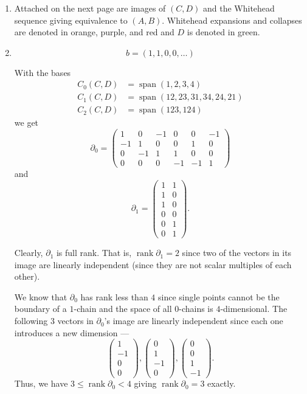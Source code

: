 \documentclass[12 pt, letterpaper]{hmcpset}
\begin{document}
\begin{solution}
	
\begin{enumerate}
	\item Attached on the next page are images of $(C, D)$ and the Whitehead sequence giving equivalence to $(A, B)$. Whitehead expansions and collapses are denoted in orange, purple, and red and $D$ is denoted in green.

	\item
		\[
			\boxed{
				b = (1, 1, 0, 0, \dots)
			}
		\]

		With the bases
		\begin{align*}
			C_{0}(C, D) & = \operatorname{span}(1, 2, 3, 4) \\
			C_{1}(C, D) & = \operatorname{span}(12, 23, 31, 34, 24, 21) \\
			C_{2}(C, D) & = \operatorname{span}(123, 124)
		\end{align*}
		we get
		\[
			\partial_{0} = \begin{pmatrix}
				1 & 0 & -1 & 0 & 0 & -1 \\
				-1 & 1 & 0 & 0 & 1 & 0 \\
				0 & -1 & 1 & 1 & 0 & 0 \\
				0 & 0 & 0 & -1 & -1 & 1
			\end{pmatrix}
		\]
		and
		\[
			\partial_{1} = \begin{pmatrix}
				1 & 1 \\
				1 & 0 \\
				1 & 0 \\
				0 & 0 \\
				0 & 1 \\
				0 & 1
			\end{pmatrix}.
		\]

		Clearly, $\partial_{1}$ is full rank. That is, $\operatorname{rank} \partial_{1} = 2$ since two of the vectors in its image are linearly independent (since they are not scalar multiples of each other).

		We know that $\partial_{0}$ has rank less than $4$ since single points cannot be the boundary of a $1$-chain and the space of all $0$-chains is  $4$-dimensional. The following $3$ vectors in $\partial_{0}$'s image are linearly independent since each one introduces a new dimension ---
		\[
			\begin{pmatrix}
				1 \\
				-1 \\
				0 \\
				0
			\end{pmatrix}, \begin{pmatrix}
				0 \\
				1 \\
				-1 \\
				0
			\end{pmatrix}, \begin{pmatrix}
				0 \\
				0 \\
				1 \\
				-1
			\end{pmatrix}.
		\]
		Thus, we have $3 \le \operatorname{rank} \partial_{0} < 4$ giving $\operatorname{rank} \partial_{0} = 3$ exactly.


\end{enumerate}
\end{solution}
\end{document}
